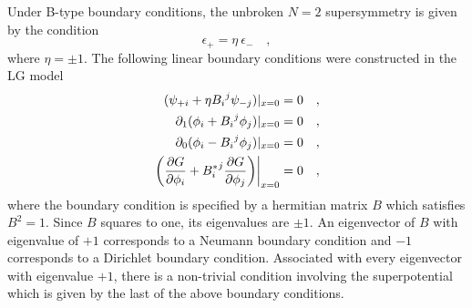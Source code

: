 \documentclass[a4paper,12pt]{article}
\begin{document}
Under B-type boundary conditions, the unbroken $N=2$ supersymmetry
is given by the condition
\begin{equation}
\epsilon_+ = \eta\ \epsilon_-\quad,
\end{equation}
where $\eta=\pm1$. The following linear boundary conditions
were constructed in the LG model\cite{stt} 
\begin{eqnarray}
(\psi_{+i} + \eta {B_i}^j\psi_{-j})|_{x=0}=0\quad, \nonumber  \\
\partial_1(\phi_i + {B_i}^j\phi_j)|_{x=0}=0\quad, \nonumber  \\
 \partial_0(\phi_i - {B_i}^j\phi_j)|_{x=0}=0\quad, \nonumber  \\
\left.\left({{\partial G}\over{\partial\phi_i}} + {B^*_i}^j {{\partial
G}\over{\partial\phi_j}}\right)\right|_{x=0}=0 \quad,
\end{eqnarray}
where the boundary condition is specified by a hermitian matrix
$B$ which satisfies $B^2=1$.  Since $B$ squares to one, its
eigenvalues are $\pm1$.  An eigenvector of $B$ with eigenvalue of
$+1$ corresponds to a Neumann boundary condition and $-1$
corresponds to a Dirichlet boundary condition. Associated with
every eigenvector with eigenvalue $+1$, there is a non-trivial
condition involving the superpotential which is given by the last
of the above boundary conditions. 
\end{document}

